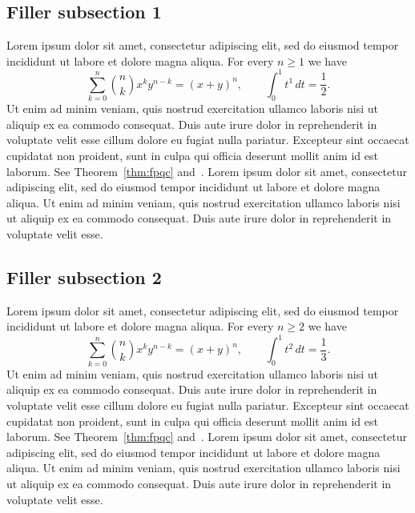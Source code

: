 \documentclass[11pt]{amsart}
\theoremstyle{definition}
\theoremstyle{remark}
\begin{document}
\subsection{Filler subsection 1}
Lorem ipsum dolor sit amet, consectetur adipiscing elit, sed do eiusmod
tempor incididunt ut labore et dolore magna aliqua. For every $n\ge 1$ we have
\[
\sum_{k=0}^{n}\binom{n}{k}x^k y^{n-k}=(x+y)^n,\qquad
\int_0^1 t^{1}\,dt=\frac{1}{2}.
\]
Ut enim ad minim veniam, quis nostrud exercitation ullamco laboris nisi ut
aliquip ex ea commodo consequat. Duis aute irure dolor in reprehenderit in
voluptate velit esse cillum dolore eu fugiat nulla pariatur. Excepteur sint
occaecat cupidatat non proident, sunt in culpa qui officia deserunt mollit
anim id est laborum. See Theorem~\ref{thm:fpqc} and~\cite{Vistoli}.
Lorem ipsum dolor sit amet, consectetur adipiscing elit, sed do eiusmod
tempor incididunt ut labore et dolore magna aliqua. Ut enim ad minim veniam,
quis nostrud exercitation ullamco laboris nisi ut aliquip ex ea commodo
consequat. Duis aute irure dolor in reprehenderit in voluptate velit esse.

\subsection{Filler subsection 2}
Lorem ipsum dolor sit amet, consectetur adipiscing elit, sed do eiusmod
tempor incididunt ut labore et dolore magna aliqua. For every $n\ge 2$ we have
\[
\sum_{k=0}^{n}\binom{n}{k}x^k y^{n-k}=(x+y)^n,\qquad
\int_0^1 t^{2}\,dt=\frac{1}{3}.
\]
Ut enim ad minim veniam, quis nostrud exercitation ullamco laboris nisi ut
aliquip ex ea commodo consequat. Duis aute irure dolor in reprehenderit in
voluptate velit esse cillum dolore eu fugiat nulla pariatur. Excepteur sint
occaecat cupidatat non proident, sunt in culpa qui officia deserunt mollit
anim id est laborum. See Theorem~\ref{thm:fpqc} and~\cite{Vistoli}.
Lorem ipsum dolor sit amet, consectetur adipiscing elit, sed do eiusmod
tempor incididunt ut labore et dolore magna aliqua. Ut enim ad minim veniam,
quis nostrud exercitation ullamco laboris nisi ut aliquip ex ea commodo
consequat. Duis aute irure dolor in reprehenderit in voluptate velit esse.
\end{document}
